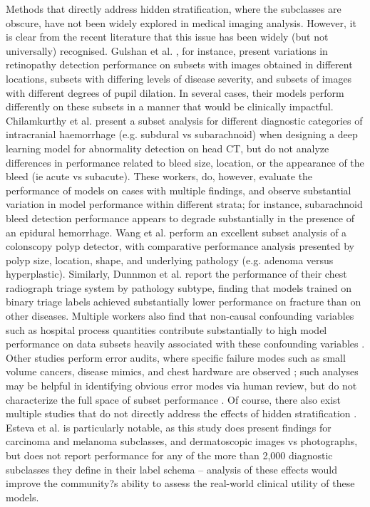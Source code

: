 \documentclass{article}
\begin{document}
Methods that directly address hidden stratification, where the subclasses are obscure, have not been widely explored in medical imaging analysis.  However, it is clear from the recent literature that this issue has been widely (but not universally) recognised.  
Gulshan et al. \citep{Gulshan2016-we}, for instance, present variations in retinopathy detection performance on subsets with images obtained in different locations, subsets with differing levels of disease severity, and subsets of images with different degrees of pupil dilation.  
In several cases, their models perform differently on these subsets in a manner that would be clinically impactful.  Chilamkurthy et al. \citep{Chilamkurthy2018-op}  present a subset analysis for different diagnostic categories of intracranial haemorrhage (e.g. subdural vs subarachnoid) when designing a deep learning model for abnormality detection on head CT, but do not analyze differences in  performance related to bleed size, location, or the appearance of the bleed (ie acute vs subacute). 
 These workers, do, however, evaluate the performance of models on cases with multiple findings, and observe substantial variation in model performance within different strata; for instance, subarachnoid bleed detection performance appears to degrade substantially in the presence of an epidural hemorrhage.  
Wang et al. \citep{Wang2019-jr} perform an excellent subset analysis of a colonscopy polyp detector, with comparative performance analysis presented by polyp size, location, shape, and underlying pathology (e.g. adenoma versus hyperplastic).  
 Similarly, Dunnmon et al. \citep{Dunnmon2019-rr} report the performance of their chest radiograph triage system by pathology subtype, finding that models trained on binary triage labels achieved substantially lower performance on fracture than on other diseases.   
 Multiple workers also find that non-causal confounding variables such as hospital process quantities contribute substantially to high model performance on data subsets heavily associated with these confounding variables \citep{Winkler2019-fw, Badgeley2019-zi, Agniel2018-qp, Zech2018-xq} . Other studies perform error audits, where specific failure modes such as small volume cancers, disease mimics, and chest hardware are observed \citep{Taylor2018-ak, Campanella2019-qs}; such analyses may be helpful in identifying obvious error modes via human review, but do not characterize the full space of subset performance \citep{Selbst2017-gz}.  
 Of course, there also exist multiple studies that do not directly address the effects of hidden stratification \citep{Haenssle2018-vw, Bien2018-ae}. 
 Esteva et al. \citep{Esteva2017-if} is particularly notable, as this study does present findings for carcinoma and melanoma subclasses, and dermatoscopic images vs photographs, but does not report performance for any of the more than 2,000 diagnostic subclasses they define in their label schema -- analysis of these effects would improve the community?s ability to assess the real-world clinical utility of these models. 
 
\end{document}
